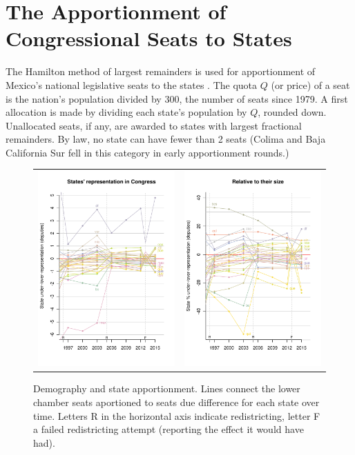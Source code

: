 \documentclass[letter,12pt]{article}
\begin{document}
\section{The Apportionment of Congressional Seats to States}

The Hamilton method of largest remainders is used for apportionment of Mexico's national legislative seats to the states \citep[][:10]{balinskiYoung2001FairRep}. The quota $Q$ (or price) of a seat is the nation's population divided by 300, the number of seats since 1979. A first allocation is made by dividing each state's population by $Q$, rounded down. Unallocated seats, if any, are awarded to states with largest fractional remainders. By law, no state can have fewer than 2 seats (Colima and Baja California Sur fell in this category in early apportionment rounds.) 

\begin{figure}
\begin{center}
  \begin{tabular}{cc}
    \includegraphics[width=.45\columnwidth]{statesUnderOverRep.pdf} & 
    \includegraphics[width=.45\columnwidth]{statesUnderOverRep-rel.pdf} \\ 
  \end{tabular}
  \caption{Demography and state apportionment. Lines connect the lower chamber seats aportioned to seats due difference for each state over time. Letters R in the horizontal axis indicate redistricting, letter F a failed redistricting attempt (reporting the effect it would have had).}\label{F:underOverRep}
\end{center}
\end{figure}
\end{document}
